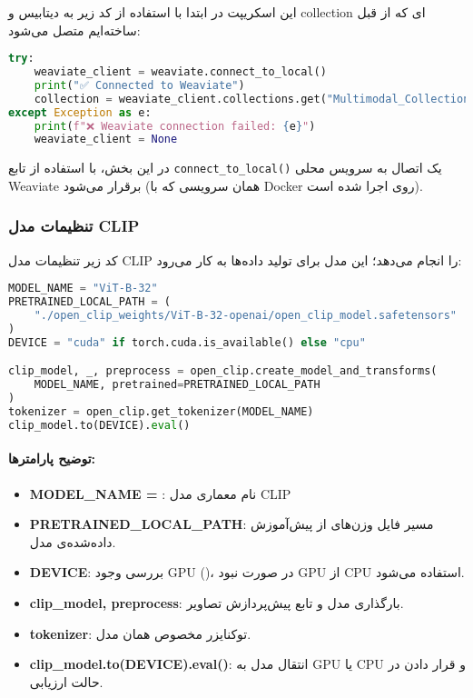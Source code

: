 \documentclass{article}
\begin{document}
این اسکریپت در ابتدا با استفاده از کد زیر به دیتابیس و collection ای که از قبل ساخته‌ایم متصل می‌شود:

\begin{latin}
\begin{lstlisting}[language=python]
try:
    weaviate_client = weaviate.connect_to_local()
    print("✅ Connected to Weaviate")
    collection = weaviate_client.collections.get("Multimodal_Collection")
except Exception as e:
    print(f"❌ Weaviate connection failed: {e}")
    weaviate_client = None
\end{lstlisting}
\end{latin}

در این بخش، با استفاده از تابع \texttt{connect\_to\_local()} یک اتصال به سرویس محلی Weaviate برقرار می‌شود (همان سرویسی که با Docker روی  اجرا شده است).

\subsubsection*{تنظیمات مدل CLIP}

کد زیر تنظیمات مدل CLIP را انجام می‌دهد؛ این مدل برای تولید  داده‌ها به کار می‌رود:

\begin{latin}
\begin{lstlisting}[language=python]
MODEL_NAME = "ViT-B-32"
PRETRAINED_LOCAL_PATH = (
    "./open_clip_weights/ViT-B-32-openai/open_clip_model.safetensors"
)
DEVICE = "cuda" if torch.cuda.is_available() else "cpu"

clip_model, _, preprocess = open_clip.create_model_and_transforms(
    MODEL_NAME, pretrained=PRETRAINED_LOCAL_PATH
)
tokenizer = open_clip.get_tokenizer(MODEL_NAME)
clip_model.to(DEVICE).eval()
\end{lstlisting}
\end{latin}

\paragraph{توضیح پارامترها:}
\begin{itemize}
    \item \textbf {MODEL\_NAME = }: نام معماری مدل CLIP 
    \item \textbf{PRETRAINED\_LOCAL\_PATH}: مسیر فایل وزن‌های از پیش‌آموزش داده‌شده‌ی مدل.
    \item \textbf{DEVICE}: بررسی وجود GPU ()، در صورت نبود GPU از CPU استفاده می‌شود.
    \item \textbf{clip\_model, preprocess}: بارگذاری مدل و تابع پیش‌پردازش تصاویر.
    \item \textbf{tokenizer}: توکنایزر مخصوص همان مدل.
    \item \textbf{clip\_model.to(DEVICE).eval()}: انتقال مدل به GPU یا CPU و قرار دادن در حالت ارزیابی.
\end{itemize}
\end{document}

